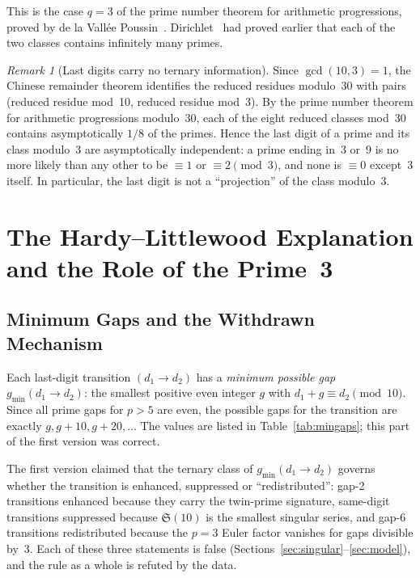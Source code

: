\documentclass[12pt,a4paper]{article}
\theoremstyle{plain}
\theoremstyle{definition}
\theoremstyle{remark}
\newtheorem{remark}[theorem]{Remark}
\newcommand{\mgap}[2]{g_{\min}(#1 \to #2)}
\begin{document}
This is the case $q = 3$ of the prime number theorem for arithmetic progressions, proved
by de la Vall\'ee Poussin~\cite{dlVP96}. Dirichlet~\cite{Dir37} had proved earlier that
each of the two classes contains infinitely many primes.

\begin{remark}[Last digits carry no ternary information]
\label{rem:crt}
Since $\gcd(10, 3) = 1$, the Chinese remainder theorem identifies the reduced residues
modulo~30 with pairs (reduced residue mod~10, reduced residue mod~3). By the prime
number theorem for arithmetic progressions modulo~30, each of the eight reduced classes
mod~30 contains asymptotically $1/8$ of the primes. Hence the last digit of a prime and
its class modulo~3 are asymptotically independent: a prime ending in~3 or~9 is no more
likely than any other to be $\equiv 1$ or $\equiv 2 \pmod 3$, and none is $\equiv 0$
except~3 itself. In particular, the last digit is not a ``projection'' of the class
modulo~3.
\end{remark}

\section{The Hardy--Littlewood Explanation and the Role of the Prime~3}
\label{sec:mechanism}

\subsection{Minimum Gaps and the Withdrawn Mechanism}

Each last-digit transition $(d_1 \to d_2)$ has a \emph{minimum possible gap}
$\mgap{d_1}{d_2}$: the smallest positive even integer $g$ with
$d_1 + g \equiv d_2 \pmod{10}$. Since all prime gaps for $p > 5$ are even, the possible
gaps for the transition are exactly $g, g + 10, g + 20, \ldots$ The values are listed in
Table~\ref{tab:mingaps}; this part of the first version was correct.

\begin{erratumbox}
\noindent The first version claimed that the ternary class of $\mgap{d_1}{d_2}$
governs whether the transition is enhanced, suppressed or ``redistributed'': gap-2
transitions enhanced because they carry the twin-prime signature, same-digit transitions
suppressed because $\mathfrak{S}(10)$ is the smallest singular series, and gap-6
transitions redistributed because the $p = 3$ Euler factor vanishes for gaps divisible
by~3. Each of these three statements is false
(Sections~\ref{sec:singular}--\ref{sec:model}), and the rule as a whole is refuted by the
data.
\end{erratumbox}
\end{document}
